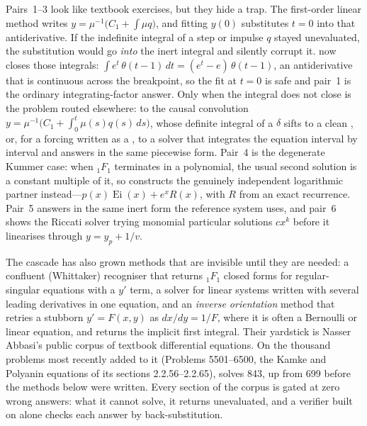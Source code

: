 Pairs~1--3 look like textbook exercises, but they hide a trap. The first-order
linear method writes \(y=\mu^{-1}\bigl(C_1+\int\mu q\bigr)\), and fitting \(y(0)\)
substitutes \(t=0\) into that antiderivative. If the indefinite integral of a step
or impulse \(q\) stayed unevaluated, the substitution would go \emph{into} the inert
integral and silently corrupt it.  now closes those integrals:
\(\int e^{t}\,\theta(t-1)\,dt = (e^{t}-e)\,\theta(t-1)\), an antiderivative that is
continuous across the breakpoint, so the fit at \(t=0\) is safe and pair~1 is the
ordinary integrating-factor answer. Only when the integral does not close is the
problem routed elsewhere: to the causal convolution
\(y=\mu^{-1}\bigl(C_1+\int_0^t\mu(s)q(s)\,ds\bigr)\), whose definite integral of a
\(\delta\) sifts to a clean , or, for a forcing written as a
, to a solver that integrates the equation interval by interval
and answers in the same piecewise form. Pair~4 is the degenerate Kummer case: when
\({}_1F_1\) terminates in a polynomial, the usual second solution
 is a constant multiple of it, so  constructs the
genuinely independent logarithmic partner instead---\(p(x)\operatorname{Ei}(x)+e^x
R(x)\), with \(R\) from an exact recurrence. Pair~5 answers in the same inert form the
reference system uses, and pair~6 shows the Riccati solver trying monomial
particular solutions \(cx^k\) before it linearises through \(y=y_p+1/v\).

The cascade has also grown methods that are invisible until they are needed: a
confluent (Whittaker) recogniser that returns \({}_1F_1\) closed forms for
regular-singular equations with a \(y'\) term, a solver for linear systems written
with several leading derivatives in one equation, and an \emph{inverse orientation}
method that retries a stubborn \(y'=F(x,y)\) as
\(dx/dy=1/F\), where it is often a Bernoulli or linear equation, and returns the
implicit first integral. Their yardstick is Nasser Abbasi's public corpus of
textbook differential equations. On the
thousand problems most recently added to it (Problems 5501--6500, the Kamke and
Polyanin equations of its sections 2.2.56--2.2.65),  solves 843, up from
699 before the methods below were written. Every section of the corpus is gated at zero
wrong answers: what it cannot solve, it returns unevaluated, and a verifier built on
 alone checks each answer by back-substitution.


